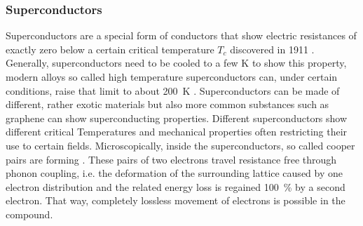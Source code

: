             \subsubsection{Superconductors}
            \label{section:theory:superconductor}
            Superconductors are a special form of conductors that show electric resistances of exactly zero below a certain critical temperature $T_c$ discovered in 1911 \cite{onnes_resistance_nodate}. Generally, superconductors need to be cooled to a few \si{\kelvin} to show this property, modern alloys so called high temperature superconductors can, under certain conditions, raise that limit to about \SI{200}{\kelvin} \cite{drozdov_conventional_2015}. Superconductors can be made of different, rather exotic materials but also more common substances such as graphene can show superconducting properties. Different superconductors show different critical Temperatures and mechanical properties often restricting their use to certain fields. Microscopically, inside the superconductors, so called cooper pairs are forming \cite{bardeen_theory_1957}. These pairs of two electrons travel resistance free through phonon coupling, i.e. the deformation of the surrounding lattice caused by one electron distribution and the related energy loss is regained \SI{100}{\percent} by a second electron. That way, completely lossless movement of electrons is possible in the compound.
